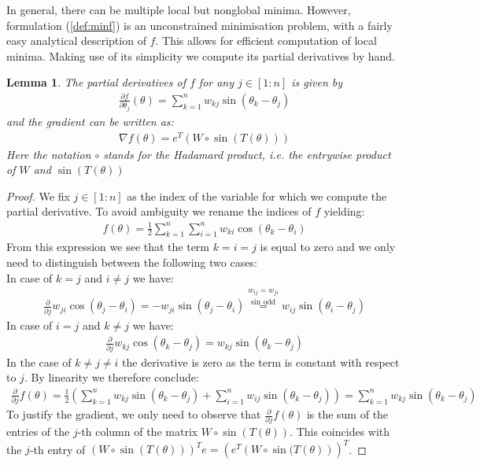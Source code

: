 \documentclass[12pt,a4paper]{article}
\theoremstyle{mythm}
\newtheorem{lem}[thm]{Lemma}
\begin{document}
In general, there can be multiple local but nonglobal minima.
However, formulation (\ref{def:minf}) is an unconstrained minimisation problem, with a fairly easy analytical description of $ f $. 
This allows for efficient computation of local minima.
Making use of its simplicity we compute its partial derivatives by hand.
\begin{lem}
The partial derivatives of $ f $ for any $ j \in \left[ 1 : n \right]  $ is given by
\begin{align*}
\frac{ \partial f }{ \partial \theta _{ j }  } (\theta) = \sum_{ k = 1 }^{ n } w _{ kj } \sin \left( \theta _{ k } - \theta _{ j }  \right) 
\end{align*} 
and the gradient can be written as:
\begin{align}
\label{eq:gradf} 
\nabla f(\theta) = e^T\left( W \circ \sin( T(\theta ) ) \right) 
\end{align} 
Here the notation $ \circ $ stands for the Hadamard product, i.e. the entrywise product of $ W $ and $ \sin( T (\theta ) ) $ 
\end{lem} 
\begin{proof}
We fix $ j \in \left[ 1:n \right] $ as the index of the variable for which we compute the partial derivative. To avoid ambiguity we rename the indices of $ f $ yielding:
\begin{align*}
f(\theta) = \frac{ 1 }{ 2 } \sum_{ k = 1 }^{ n } \sum_{ i = 1 }^{ n } w _{ ki } \cos( \theta_k - \theta_i ) 
\end{align*} 
From this expression we see that the term $ k=i=j $ is equal to zero and we only need to distinguish between the following two cases: \\
In case of $ k = j $ and $ i \neq j  $ we have:
\begin{align*}
\frac{ \partial  }{ \partial j } w _{ ji } \cos( \theta _{ j } - \theta_i)  = -w _{ ji } \sin( \theta_j - \theta_i  ) 
\overset{ w _{ ij } = w _{ ji }  }{ \overset{ \sin \text{ odd}   }{ =}  } 
w _{ij} \sin( \theta_i - \theta_j) 
\end{align*} 
In case of $ i = j $ and $ k \neq j  $ we have:
\begin{align*}
\frac{ \partial  }{ \partial j } w _{ kj } \cos( \theta _{ k } - \theta_j)  = w _{ kj } \sin( \theta_k - \theta_j  ) 
\end{align*} 
In the case of $ k \neq j \neq i $ the derivative is zero as the term is constant with respect to $ j $. 
By linearity we therefore conclude:
\begin{align*}
\frac{ \partial  }{ \partial j } f(\theta) = \frac{ 1 }{ 2 } \left( \sum_{ k = 1 }^{ n } w _{ kj } \sin( \theta_k - \theta_j ) + \sum_{ i = 1 }^{ n } w _{ ij } \sin( \theta_k
- \theta_j )   \right) = \sum_{ k = 1 }^{ n } w _{ kj } \sin( \theta_k - \theta_j )
\end{align*} 
To justify the gradient, we only need to observe that $ \frac{ \partial  }{ \partial j } f(\theta) $ is the sum of the entries of the $ j $-th column of the matrix $ W \circ
\sin( T(\theta) )  $. This coincides with the $ j $-th entry of $ \left( W \circ \sin( T(\theta) )  \right) ^T e = \left( e^T \left( W \circ \sin( T (\theta )  \right)
\right)^T$.
\end{proof}
\end{document}
